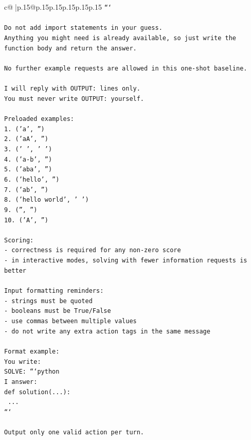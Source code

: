 \documentclass{article}
\begin{document}
{\begin{supertabular}{c@{$\;$}|p{.15\linewidth}@{}p{.15\linewidth}p{.15\linewidth}p{.15\linewidth}p{.15\linewidth}p{.15\linewidth}}
{{{\texttt{```} \\
\\ 
\texttt{Do not add import statements in your guess.} \\
\texttt{Anything you might need is already available, so just write the function body and return the answer.} \\
\\ 
\texttt{No further example requests are allowed in this one{-}shot baseline.} \\
\\ 
\texttt{I will reply with OUTPUT: lines only.} \\
\texttt{You must never write OUTPUT: yourself.} \\
\\ 
\texttt{Preloaded examples:} \\
\texttt{1. ('a', '')} \\
\texttt{2. ('aA', '')} \\
\texttt{3. ('   ', '   ')} \\
\texttt{4. ('a{-}b', '')} \\
\texttt{5. ('aba', '')} \\
\texttt{6. ('hello', '')} \\
\texttt{7. ('ab', '')} \\
\texttt{8. ('hello world', ' ')} \\
\texttt{9. ('', '')} \\
\texttt{10. ('A', '')} \\
\\ 
\texttt{Scoring:} \\
\texttt{{-} correctness is required for any non{-}zero score} \\
\texttt{{-} in interactive modes, solving with fewer information requests is better} \\
\\ 
\texttt{Input formatting reminders:} \\
\texttt{{-} strings must be quoted} \\
\texttt{{-} booleans must be True/False} \\
\texttt{{-} use commas between multiple values} \\
\texttt{{-} do not write any extra action tags in the same message} \\
\\ 
\texttt{Format example:} \\
\texttt{You write:} \\
\texttt{SOLVE: ```python} \\
\texttt{I answer:} \\
\texttt{def solution(...):} \\
\texttt{    ...} \\
\texttt{```} \\
\\ 
\texttt{Output only one valid action per turn.} \\
            }
        }
    }
     \\ \\


\end{supertabular}}
\end{document}
